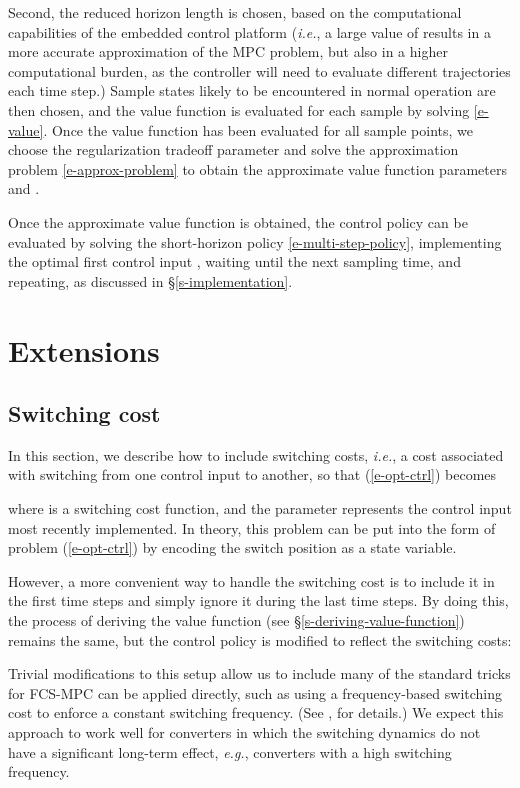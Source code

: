 \documentclass[12pt]{article}
\newcommand{\eg}{{\it e.g.}}
\newcommand{\ie}{{\it i.e.}}
\begin{document}
Second,
the reduced horizon length  is chosen,
based on the computational capabilities of the embedded control platform
(\ie, a large value of  
results in a more accurate approximation of the MPC problem,
but also in a higher computational burden,
as the controller will need to evaluate  different trajectories each time step.)
Sample states likely to be encountered in normal operation are then chosen,
and the value function 
is evaluated for each sample  by solving \eqref{e-value}.
Once the value function has been evaluated for all sample points,
we choose the regularization tradeoff parameter 
and solve the approximation problem \eqref{e-approx-problem}
to obtain the approximate value function
parameters  and .

Once the approximate value function is obtained,
the control policy can be evaluated by solving the short-horizon policy 
\eqref{e-multi-step-policy},
implementing the optimal first control input ,
waiting until the next sampling time, and repeating,
as discussed in \S\ref{s-implementation}.




\section{Extensions}
\subsection{Switching cost}
In this section, we describe how to include switching costs,
\ie, a cost associated with switching from one control input to another,
so that (\ref{e-opt-ctrl}) becomes

where  is a switching cost function,
and the parameter  represents the control input
most recently implemented.
In theory,
this problem
can be put into the form of problem (\ref{e-opt-ctrl})
by encoding the switch position as a state variable.


However, a more convenient way to handle the switching cost is to 
include it in the first  time steps 
and simply ignore it during the last  time steps.
By doing this, the process of deriving the value function 
(see \S\ref{s-deriving-value-function})
remains the same,
but the control policy is modified to reflect the switching costs:

Trivial modifications to this setup allow us to include
many of the standard tricks for FCS-MPC can be applied directly,
such as using a frequency-based switching cost
to enforce a constant switching frequency.
(See \cite{kouro2009model, cortes2008predictive}, for details.)
We expect this approach to work well for
converters in which the switching dynamics do not
have a significant long-term effect,
\eg, converters with a high switching frequency.
\end{document}
